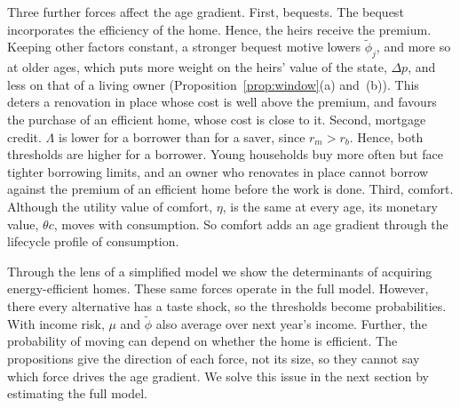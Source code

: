 Three further forces affect the age gradient. First, bequests. The bequest incorporates the efficiency of the home. Hence, the heirs receive
the premium. Keeping other factors constant, a stronger bequest motive lowers
$\tilde\phi_j$, and more so at older ages, which puts more weight on the heirs' value of the state,
$\Delta p$, and less on that of a living owner
(Proposition~\ref{prop:window}(a) and~(b)). This deters a renovation in place whose
cost is well above the premium, and favours the purchase of an efficient
home, whose cost is close to it. Second, mortgage credit. $\Lambda$ is
lower for a borrower than for a saver, since $r_m>r_b$. Hence, both thresholds
are higher for a borrower. Young households buy more often but face
tighter borrowing limits, and an owner who renovates in place cannot borrow against the premium of an
efficient home before the work is done. Third, comfort. Although the utility
value of comfort, $\eta$, is the same at every age, its monetary value,
$\theta c$, moves with consumption. So comfort adds an age gradient 
through the lifecycle profile of consumption.


Through the lens of a simplified model we show the determinants of acquiring energy-efficient homes. These same forces operate in the full model. However, there every
alternative has a taste shock, so the thresholds become probabilities. With income risk, $\mu$ and $\tilde\phi$ also average over next
year's income. Further, the probability of moving can depend on whether the
home is efficient. The propositions give the direction of each force, not its size, so they
cannot say which force drives the age gradient. We solve this issue in the next section by estimating the full model.
\endgroup
